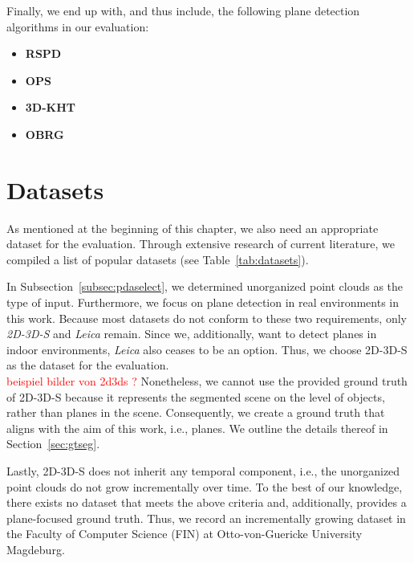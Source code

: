 \documentclass[main.tex]{subfiles}
\begin{document}
Finally, we end up with, and thus include, the following plane detection algorithms in our evaluation:

\begin{itemize}
    \item \textbf{RSPD}
    \item \textbf{OPS}
    \item \textbf{3D-KHT}
    \item \textbf{OBRG}
\end{itemize}

\section{Datasets}
As mentioned at the beginning of this chapter, we also need an appropriate dataset for the evaluation.
Through extensive research of current literature, we compiled a list of popular datasets (see Table~\ref{tab:datasets}).

In Subsection~\ref{subsec:pdaselect}, we determined unorganized point clouds as the type of input. Furthermore, we focus on plane detection in real environments in this work.
Because most datasets do not conform to these two requirements, only \textit{2D-3D-S} and \textit{Leica} remain. Since we, additionally, want to detect planes in indoor environments, 
\textit{Leica} also ceases to be an option. Thus, we choose 2D-3D-S as the dataset for the evaluation.
\textcolor{red}{\\beispiel bilder von 2d3ds ?}\newline
Nonetheless, we cannot use the provided ground truth of 2D-3D-S because it represents the segmented scene on the level of objects, rather than planes in the scene.
Consequently, we create a ground truth that aligns with the aim of this work, i.e., planes. We outline the details thereof in Section~\ref{sec:gtseg}.  

Lastly, 2D-3D-S does not inherit any temporal component, i.e., the unorganized point clouds do not grow incrementally over time. 
To the best of our knowledge, there exists no dataset that meets the above criteria and, additionally, provides a plane-focused ground truth. 
Thus, we record an incrementally growing dataset in the Faculty of Computer Science (FIN) at Otto-von-Guericke University Magdeburg.
\end{document}
